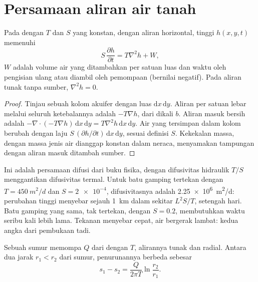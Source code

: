 \section{Persamaan aliran air tanah}\label{sec:b3:hydrogeology:flow-equation}

\begin{theorem}\label{thm:b3:hydrogeology:flow-equation}
Pada  dengan  $T$ dan  $S$ yang konstan,
dengan aliran horizontal, tinggi $h(x, y, t)$ memenuhi
\[
S\,\frac{\partial h}{\partial t} = T\nabla^2h + W ,
\]
$W$ adalah volume air yang ditambahkan per satuan luas dan waktu oleh pengisian ulang atau
diambil oleh pemompaan (bernilai negatif). Pada aliran tunak tanpa sumber, $\nabla^2h =
0$.
\end{theorem}

\begin{proof}
Tinjau sebuah kolom akuifer dengan luas $\mathrm dx\,\mathrm dy$. Aliran per
satuan lebar melalui seluruh ketebalannya adalah $-T\nabla h$, dari 
dikali $b$. Aliran masuk bersih adalah $-\nabla\cdot(-T\nabla h)\,\mathrm dx\,\mathrm
dy = T\nabla^2h\,\mathrm dx\,\mathrm dy$. Air yang tersimpan dalam kolom
berubah dengan laju $S\,(\partial h/\partial t)\,\mathrm dx\,\mathrm dy$,
sesuai definisi $S$. Kekekalan massa, dengan massa jenis air dianggap
konstan dalam neraca, menyamakan tampungan dengan aliran masuk ditambah sumber.
\end{proof}

Ini adalah persamaan difusi dari buku fisika, dengan difusivitas hidraulik
$T/S$ menggantikan difusivitas termal. Untuk batu gamping tertekan dengan
$T = \qty{450}{m^2/d}$ dan $S = \num{2e-4}$, difusivitasnya adalah
\qty{2.25e6}{m^2/d}: perubahan tinggi menyebar sejauh \qty{1}{km} dalam
sekitar $L^2S/T$, setengah hari. Batu gamping yang sama, tak tertekan, dengan $S =
0.2$, membutuhkan waktu seribu kali lebih lama. Tekanan menyebar cepat, air
bergerak lambat: kedua angka dari pembukaan tadi.

\begin{proposition}\label{prop:b3:hydrogeology:thiem}
Sebuah sumur memompa $Q$ dari  dengan  $T$, alirannya
tunak dan radial. Antara dua jarak $r_1 < r_2$ dari sumur, penurunannya
berbeda sebesar
\[
s_1 - s_2 = \frac{Q}{2\pi T}\ln\frac{r_2}{r_1} .
\]
\end{proposition}

